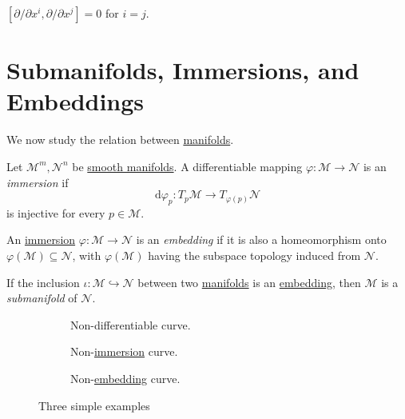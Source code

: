 \begin{eg}
	\([\partial / \partial x^i, \partial / \partial x^j] = 0\) for \(i = j\).
\end{eg}

\section{Submanifolds, Immersions, and Embeddings}
We now study the relation between \hyperref[def:smooth-manifold]{manifolds}.

\begin{definition}[Immersion]\label{def:immersion}
	Let \(\mathcal{M} ^m , \mathcal{N} ^n \) be \hyperref[def:smooth-manifold]{smooth manifolds}. A differentiable mapping \(\varphi \colon \mathcal{M} \to \mathcal{N} \) is an \emph{immersion} if
	\[
		\mathrm{d} \varphi _p \colon T_p \mathcal{M} \to T_{\varphi (p)} \mathcal{N}
	\]
	is injective for every \(p\in \mathcal{M} \).
\end{definition}

\begin{definition}[Embedding]\label{def:embedding}
	An \hyperref[def:immersion]{immersion} \(\varphi \colon \mathcal{M} \to \mathcal{N} \) is an \emph{embedding} if it is also a homeomorphism onto \(\varphi (\mathcal{M} )\subseteq \mathcal{N} \), with \(\varphi (\mathcal{M} )\) having the subspace topology induced from \(\mathcal{N} \).
\end{definition}

\begin{definition}[Submanifold]\label{def:submanifold}
	If the inclusion \(\iota \colon \mathcal{M} \hookrightarrow \mathcal{N} \) between two \hyperref[def:smooth-manifold]{manifolds} is an \hyperref[def:embedding]{embedding}, then \(\mathcal{M} \) is a \emph{submanifold} of \(\mathcal{N} \).
\end{definition}

\begin{figure}[H]
	\centering
	\begin{subfigure}[b]{0.3\textwidth}
		\centering
		\caption{Non-differentiable curve.}
	\end{subfigure}
	\hfill
	\begin{subfigure}[b]{0.3\textwidth}
		\centering
		\caption{Non-\hyperref[def:immersion]{immersion} curve.}
	\end{subfigure}
	\hfill
	\begin{subfigure}[b]{0.3\textwidth}
		\centering
		\caption{Non-\hyperref[def:embedding]{embedding} curve.}
	\end{subfigure}
	\caption{Three simple examples}
\end{figure}

